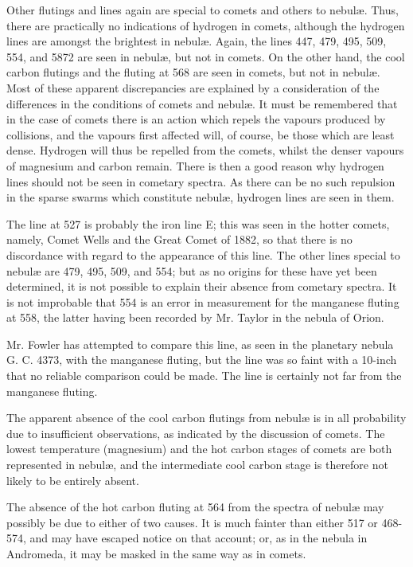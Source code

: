 \documentclass[a4paper, 12pt, oneside, polutonikogreek, english]{article}
\begin{document}
Other flutings and lines again are special to comets and others to nebulæ. Thus, there are practically no indications of hydrogen in comets, although the hydrogen lines are amongst the brightest in nebulæ. Again, the lines 447, 479, 495, 509, 554, and 5872 are seen in nebulæ, but not in comets. On the other hand, the cool carbon flutings and the fluting at 568 are seen in comets, but not in nebulæ. Most of these apparent discrepancies are explained by a consideration of the differences in the conditions of comets and nebulæ. It must be remembered that in the case of comets there is an action which repels the vapours produced by collisions, and the vapours first affected will, of course, be those which are least dense. Hydrogen will thus be repelled from the comets, whilst the denser vapours of magnesium and carbon remain. There is then a good reason why hydrogen lines should not be seen in cometary spectra. As there can be no such repulsion in the sparse swarms which constitute nebulæ, hydrogen lines are seen in them.

The line at 527 is probably the iron line E; this was seen in the hotter comets, namely, Comet Wells and the Great Comet of 1882, so that there is no discordance with regard to the appearance of this line. The other lines special to nebulæ are 479, 495, 509, and 554; but as no origins for these have yet been determined, it is not possible to explain their absence from cometary spectra. It is not improbable that 554 is an error in measurement for the manganese fluting at 558, the latter having been recorded by Mr. Taylor in the nebula of Orion.

Mr. Fowler has attempted to compare this line, as seen in the planetary nebula G. C. 4373, with the manganese fluting, but the line was so faint with a 10-inch that no reliable comparison could be made. The line is certainly not far from the manganese fluting.

The apparent absence of the cool carbon flutings from nebulæ is in all probability due to insufficient observations, as indicated by the discussion of comets. The lowest temperature (magnesium) and the hot carbon stages of comets are both represented in nebulæ, and the intermediate cool carbon stage is therefore not likely to be entirely absent.

The absence of the hot carbon fluting at 564 from the spectra of nebulæ may possibly be due to either of two causes. It is much fainter than either 517 or 468-574, and may have escaped notice on that account; or, as in the nebula in Andromeda, it may be masked in the same way as in comets.
\end{document}
